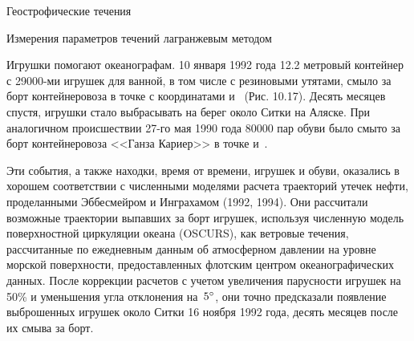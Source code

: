 \begin{chapter}{Геострофические течения}
\begin{section}{Измерения параметров течений лагранжевым методом}
\begin{paragraph}{Игрушки помогают океанографам.}
10 января 1992 года 12.2 метровый контейнер с 29000-ми игрушек для
ванной, в том числе с резиновыми утятами, смыло за борт контейнеровоза
в точке с координатами  и~
(Рис. 10.17).  Десять месяцев спустя, игрушки стало выбрасывать на
берег около Ситки на Аляске. При аналогичном происшествии 27-го мая
1990 года 80000 пар обуви было смыто за борт контейнеровоза <<Ганза
Кариер>> в точке  и~.
%

Эти события, а также находки, время от времени, игрушек и обуви,
оказались в хорошем соответствии с численными моделями расчета
траекторий утечек нефти, проделанными Эббесмейром и Инграхамом (1992,
1994). Они рассчитали возможные траектории выпавших за борт игрушек,
используя численную модель поверхностной циркуляции океана (OSCURS),
как ветровые течения, рассчитанные по ежедневным данным об атмосферном
давлении на уровне морской поверхности, предоставленных флотским
центром океанографических данных. После коррекции расчетов с учетом
увеличения парусности игрушек на 50\% и уменьшения угла отклонения
на~${5}^\circ$, они точно предсказали появление выброшенных игрушек
около Ситки 16 ноября 1992 года, десять месяцев после их смыва за
борт.
%
\end{paragraph}
\end{section}



\end{chapter}
